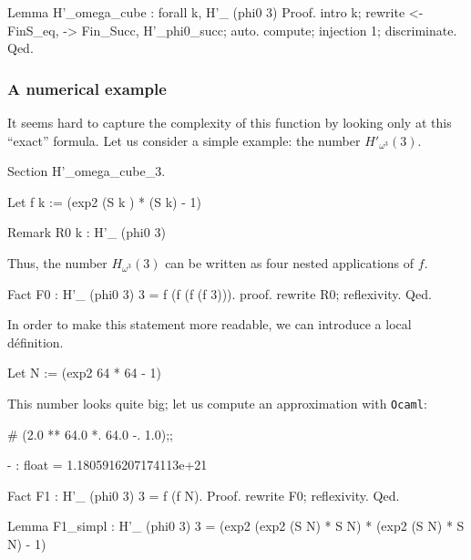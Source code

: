 \begin{Coqsrc}
Lemma H'_omega_cube : forall k,
    H'_ (phi0 3)%
Proof.
  intro k; rewrite <-FinS_eq, -> Fin_Succ, H'_phi0_succ; auto.
  compute; injection 1; discriminate.
Qed.
\end{Coqsrc}

\subsubsection{A numerical example}

It seems hard to capture the complexity of this function by looking only at this
``exact'' formula. 
Let us consider a simple example: the number $H'_{\omega^3}(3)$.  

\begin{Coqsrc}
Section H'_omega_cube_3.
  
Let f k :=   (exp2 (S k ) * (S k) - 1)%

Remark R0 k :  H'_ (phi0 3)%
\end{Coqsrc}

Thus, the number $H_{\omega^3}(3)$ can be written as four nested applications of $f$.
 
\begin{Coqsrc}
Fact F0 : H'_ (phi0 3) 3 = f (f (f (f 3))).
proof. rewrite R0; reflexivity. Qed.
\end{Coqsrc}

In order to make this statement more readable, we can introduce a local définition.

\begin{Coqsrc}
Let N := (exp2 64 * 64 - 1)%
\end{Coqsrc}

This number looks quite big; let us compute an approximation with \texttt{Ocaml}:


\begin{Coqsrc}
# (2.0 ** 64.0 *. 64.0 -. 1.0);; 
\end{Coqsrc}

\begin{Coqanswer}
- : float = 1.1805916207174113e+21
\end{Coqanswer}


\begin{Coqsrc}
Fact F1 : H'_ (phi0 3) 3 = f (f N).
Proof.
 rewrite F0; reflexivity. 
Qed.


Lemma F1_simpl : H'_ (phi0 3) 3 =
                 (exp2 (exp2 (S N) * S N) * (exp2 (S N) * S N) - 1)%

\end{Coqsrc}


